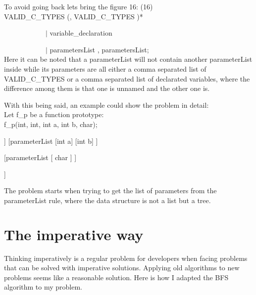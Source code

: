 \documentclass[twocolumn,10ptr]{article}
\begin{document}
	To avoid going back lets bring the figure 16: (16)\\
	
	VALID\_C\_TYPES   (\textsc{},\textsc{} VALID\_C\_TYPES )*
	
	\ \ \ \ \ \ \ \ \ \ \ \      \(\mid\) variable\_declaration
	
	\ \ \ \ \ \ \ \ \ \ \ \      \(\mid\)  parametersList \textsc{},\textsc{}  parametersList;\\
	
	Here it can be noted that a parameterList will not contain another parameterList inside while its parameters are all either a comma separated list of VALID\_C\_TYPES or a comma separated list of declarated variables, where the difference among them is that one is unnamed and the other one is.
	
	With this being said, an example could show the problem in detail:\\
	
	Let f\_p be a function prototype:\\
	
	f\_p(int, int, int a, int b, char);
	
	\newcommand*{\equal}{=}
	\newcommand*{\comma}{,}
	
	\begin{forest}
		[parameterList
		[parameterList
		[int]
		[int]
		]
		[parameterList
		[int a]
		[int b]
		]
		
		[parameterList
		[
		char
		]
		]
		
		]
		
	\end{forest}
	
	The problem starts when trying to get the list of parameters from the parameterList rule, where the data structure is not a list but a tree.
	
	\section{The imperative way}
	
	Thinking imperatively is a regular problem for developers when facing problems that can be solved with imperative solutions. Applying old algorithms to new problems seems like a reasonable solution.
	Here is how I adapted the BFS algorithm to my problem. 
	
\end{document}
